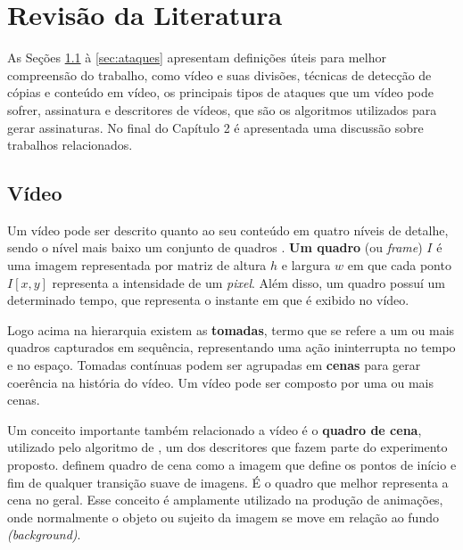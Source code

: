 

\chapter{Revisão da Literatura}
\label{chap:revisao}

As Seções \ref{sec:video} à \ref{sec:ataques} apresentam definições úteis para melhor compreensão do trabalho, como vídeo e suas divisões, técnicas de detecção de cópias e conteúdo em vídeo, os principais tipos de ataques que um vídeo pode sofrer, assinatura e descritores de vídeos, que são os algoritmos utilizados para gerar assinaturas. No final do Capítulo 2 é apresentada uma discussão sobre trabalhos relacionados.



\section{Vídeo}
\label{sec:video}  

	Um vídeo pode ser descrito quanto ao seu conteúdo em quatro níveis de detalhe, sendo o nível mais baixo um conjunto de quadros \citeauthor{lienhart1997video}. \textbf{Um quadro} (ou \textit{frame}) $I$ é uma imagem representada por matriz de altura $h$ e largura $w$ em que cada ponto $I[x,y]$ representa a intensidade de um \textit{pixel}. Além disso, um quadro possuí um determinado tempo, que representa o instante em que é exibido no vídeo. 

	Logo acima na hierarquia existem as \textbf{tomadas}, termo que se refere a um ou mais quadros capturados em sequência, representando uma ação ininterrupta no tempo e no espaço. Tomadas contínuas podem ser agrupadas em \textbf{cenas} para gerar coerência na história do vídeo. Um vídeo pode ser composto por uma ou mais cenas.

       Um conceito importante também relacionado a vídeo é o \textbf{quadro de cena}, utilizado pelo algoritmo de \citeauthor{mao2015sceneframe}, um dos descritores que fazem parte do experimento proposto. \citeauthor{7848130} definem quadro de cena como a imagem que define os pontos de início e fim de qualquer transição suave de imagens. É o quadro que melhor representa a cena no geral. Esse conceito é amplamente utilizado na produção de animações, onde normalmente o objeto ou sujeito da imagem se move em relação ao fundo \textit{(background)}. 

